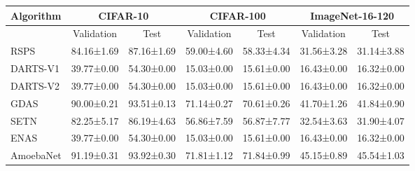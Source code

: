 \documentclass[sigconf]{acmart}
\begin{document}
\begin{table*}[!h]
\centering
\begin{tabular}{l|c|c|c|c|c|c}
\hline
\textbf{Algorithm} & \multicolumn{2}{c|}{\textbf{CIFAR-10}} & \multicolumn{2}{c|}{\textbf{CIFAR-100}} & \multicolumn{2}{c}{\textbf{ImageNet-16-120}} \\ \hline
                                        & Validation                     & Test                          & Validation                     & Test                           & Validation                        & Test                              \\ \hline
RSPS \cite{Ref:32}                                    & 84.16±1.69                     & 87.16±1.69                    & 59.00±4.60                     & 58.33±4.34                     & 31.56±3.28                        & 31.14±3.88                        \\
DARTS-V1 \cite{Ref:10}                               & 39.77±0.00                      & 54.30±0.00                     & 15.03±0.00                      & 15.61±0.00                      & 16.43±0.00                         & 16.32±0.00                         \\
DARTS-V2 \cite{Ref:10}                       & 39.77±0.00                      & 54.30±0.00                     & 15.03±0.00                     & 15.61±0.00                      & 16.43±0.00                         & 16.32±0.00                         \\
GDAS \cite{Ref:63}                        & 90.00±0.21                     & 93.51±0.13                    & 71.14±0.27                     & 70.61±0.26                     & 41.70±1.26                        & 41.84±0.90                        \\
SETN \cite{Ref:64}                             & 82.25±5.17                     & 86.19±4.63                    & 56.86±7.59                     & 56.87±7.77                     & 32.54±3.63                        & 31.90±4.07                        \\
ENAS \cite{Ref:17}                                    & 39.77±0.00                      & 54.30±0.00                     & 15.03±0.00                      & 15.61±0.00                      & 16.43±0.00                         & 16.32±0.00                         \\ 
AmoebaNet \cite{Ref:08}                                     & 91.19±0.31                     & 93.92±0.30                    & 71.81±1.12                     & 71.84±0.99                     & 45.15±0.89                        & 45.54±1.03                        \\

\end{tabular}
\end{table*}
\end{document}
